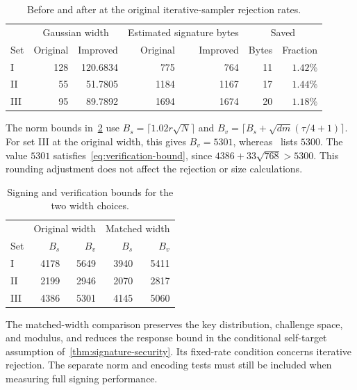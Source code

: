 \begin{table}[t]
\centering
\begin{tabular}{lrrrrrr}
\toprule
& \multicolumn{2}{c}{Gaussian width} & \multicolumn{2}{c}{Estimated signature bytes} & \multicolumn{2}{c}{Saved}\\
Set & Original & Improved & Original & Improved & Bytes & Fraction\\
\midrule
I & 128 & 120.6834 & 775 & 764 & 11 & $1.42\%$\\
II & 55 & 51.7805 & 1184 & 1167 & 17 & $1.44\%$\\
III & 95 & 89.7892 & 1694 & 1674 & 20 & $1.18\%$\\
\bottomrule
\end{tabular}
\caption{Before and after at the original iterative-sampler rejection rates.}
\label{tab:fixed-rate}
\end{table}

The norm bounds in~\cref{tab:bounds} use $B_s=\lceil1.02r\sqrt N\rceil$ and $B_v=\lceil B_s+\sqrt{dm}(\tau/4+1)\rceil$. For set III at the original width, this gives $B_v=5301$, whereas~\cite[Table~1]{GartnerFull} lists $5300$. The value $5301$ satisfies~\cref{eq:verification-bound}, since $4386+33\sqrt{768}>5300$. This rounding adjustment does not affect the rejection or size calculations.

\begin{table}[t]
\centering
\begin{tabular}{lrrrr}
\toprule
& \multicolumn{2}{c}{Original width} & \multicolumn{2}{c}{Matched width}\\
Set & $B_s$ & $B_v$ & $B_s$ & $B_v$\\
\midrule
I & 4178 & 5649 & 3940 & 5411\\
II & 2199 & 2946 & 2070 & 2817\\
III & 4386 & 5301 & 4145 & 5060\\
\bottomrule
\end{tabular}
\caption{Signing and verification bounds for the two width choices.}
\label{tab:bounds}
\end{table}

The matched-width comparison preserves the key distribution, challenge space, and modulus, and reduces the response bound in the conditional self-target assumption of~\cref{thm:signature-security}. Its fixed-rate condition concerns iterative rejection. The separate norm and encoding tests must still be included when measuring full signing performance.
